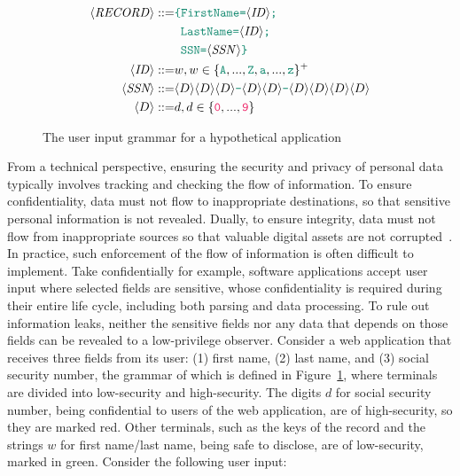 \begin{figure}[tbp]
  \small
  \begin{align*}
    \langle \mathit{RECORD} \rangle ::= & {\color{green} \texttt{\{FirstName=}} \langle \mathit{ID} \rangle {\color{green} \texttt{;}} \\
                               & \enspace {\color{green} \texttt{LastName=}} \langle \mathit{ID} \rangle {\color{green} \texttt{;}} \\
                               & \enspace {\color{green} \texttt{SSN=}} \langle \mathit{SSN} \rangle {\color{green} \texttt{\}}} \\
    \langle \mathit{ID} \rangle     ::= & w , w \in \{ {\color{green} \texttt{A}}, ..., {\color{green} \texttt{Z}}, {\color{green} \texttt{a}}, ..., {\color{green} \texttt{z}} \}^{+} \\
    \langle \textit{SSN} \rangle    ::= & \langle D \rangle \langle D \rangle \langle D \rangle {\color{green} \texttt{-}}
                                 \langle D \rangle \langle D \rangle {\color{green} \texttt{-}}
                                 \langle D \rangle \langle D \rangle \langle D \rangle \langle D \rangle \\
    \langle D \rangle      ::= & d , d \in \{ {\color{red} \texttt{0}}, ..., {\color{red} \texttt{9}} \}
  \end{align*}
  \caption{The user input grammar for a hypothetical application}
  \label{fig:grammar}
\end{figure}

From a technical perspective, ensuring the security and privacy of personal data
typically involves tracking and checking the flow of information. To ensure
confidentiality, data must not flow to inappropriate destinations, so that
sensitive personal information is not revealed. Dually, to ensure integrity,
data must not flow from inappropriate sources so that valuable digital assets
are not corrupted~\cite{sabelfeld2003language,biba1977integrity}. In practice,
such enforcement of the flow of information is often difficult to implement.
Take confidentially for example, software applications accept user input where
selected fields are sensitive, whose confidentiality is required during their
entire life cycle, including both parsing and data processing. To rule out
information leaks, neither the sensitive fields nor any data that depends on
those fields can be revealed to a low-privilege observer. Consider a web
application that receives three fields from its user: (1) first name, (2) last
name, and (3) social security number, the grammar of which is defined in
Figure~\ref{fig:grammar}, where terminals are divided into low-security and
high-security. The digits $d$ for social security number, being confidential to
users of the web application, are of high-security, so they are marked
{\color{red} red}. Other terminals, such as the keys of the record and the
strings $w$ for first name/last name, being safe to disclose, are of
low-security, marked in {\color{green} green}. Consider the following user
input:

